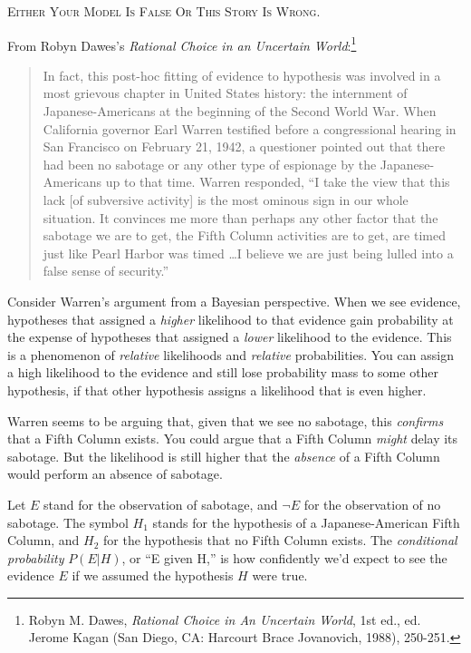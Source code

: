 \begin{center}
  \textsc{Either Your Model Is False Or This Story Is Wrong.}
\end{center}

\myendsectiontext


\bigskip


{
 From Robyn Dawes's \textit{Rational Choice in an
Uncertain World}:\footnote{Robyn M. Dawes, \textit{Rational Choice in An Uncertain World},
1st ed., ed. Jerome Kagan (San Diego, CA: Harcourt Brace Jovanovich,
1988), 250-251.}}

\begin{quote}
{
 In fact, this post-hoc fitting of evidence to hypothesis was
involved in a most grievous chapter in United States history: the
internment of Japanese-Americans at the beginning of the Second World
War. When California governor Earl Warren testified before a
congressional hearing in San Francisco on February 21, 1942, a
questioner pointed out that there had been no sabotage or any other
type of espionage by the Japanese-Americans up to that time. Warren
responded, ``I take the view that this lack [of
subversive activity] is the most ominous sign in our whole situation.
It convinces me more than perhaps any other factor that the sabotage we
are to get, the Fifth Column activities are to get, are timed just like
Pearl Harbor was timed \ldots I believe we are just being lulled into a
false sense of security.''}
\end{quote}

{
 Consider Warren's argument from a Bayesian
perspective. When we see evidence, hypotheses that assigned a
\textit{higher} likelihood to that evidence gain probability at the
expense of hypotheses that assigned a \textit{lower} likelihood to the
evidence. This is a phenomenon of \textit{relative} likelihoods and
\textit{relative} probabilities. You can assign a high likelihood to
the evidence and still lose probability mass to some other hypothesis,
if that other hypothesis assigns a likelihood that is even higher.}

{
 Warren seems to be arguing that, given that we see no sabotage,
this \textit{confirms} that a Fifth Column exists. You could argue that
a Fifth Column \textit{might} delay its sabotage. But the likelihood is
still higher that the \textit{absence} of a Fifth Column would perform
an absence of sabotage.}

{
 Let $E$ stand for the observation of sabotage, and $\lnot E$ for
the observation of no sabotage. The symbol $H_{1}$ stands
for the hypothesis of a Japanese-American Fifth Column, and
$H_{2}$ for the hypothesis that no Fifth Column exists. The
\textit{conditional probability} $P(E|H)$, or
``E given H,'' is how confidently
we'd expect to see the evidence $E$ if we assumed the
hypothesis $H$ were true.}

